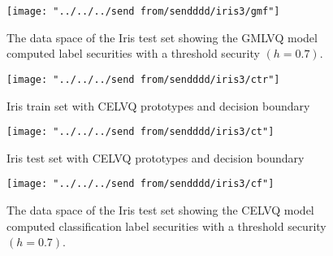 \documentclass[english]{HSMW-Thesis}
\begin{document}
\begin{figure}[H]
	\centering
	\texttt{[image: "../../../send from/sendddd/iris3/gmf"]}
	\caption[Iris test set classification label security (GMLVQ)]{The data space of the Iris test set showing the GMLVQ model computed label securities with a threshold security $(h=0.7)$.}
	\label{fig:igmd1}
\end{figure}


\begin{figure}[H]
	\centering
	\texttt{[image: "../../../send from/sendddd/iris3/ctr"]}
	\caption[Iris train set with CELVQ prototypes]{Iris train set with CELVQ prototypes and decision boundary}
	\label{fig:ic1}
\end{figure}


\begin{figure}[H]
	\centering
	\texttt{[image: "../../../send from/sendddd/iris3/ct"]}
	\caption[Iris test set with CELVQ prototypes]{Iris test set with CELVQ prototypes and decision boundary}
	\label{fig:ic2}
\end{figure}


\begin{figure}[H]
	\centering
	\texttt{[image: "../../../send from/sendddd/iris3/cf"]}
	\caption[Iris test set classification label security (CELVQ)]{The data space of the Iris test set showing the CELVQ model computed classification label securities with a threshold security $(h=0.7)$.}
	\label{fig:icd1}
\end{figure}
\end{document}
